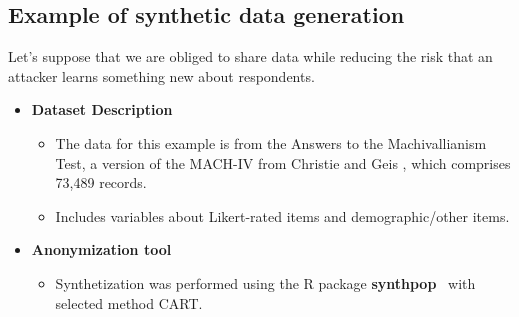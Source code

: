 \documentclass[a0,portrait]{a0poster}
\begin{document}
\begin{multicols}{3}
\columnbreak %

\section{Example of synthetic data generation}

Let's suppose that we are obliged to share data 
while reducing the risk that an attacker learns something new about respondents.

\begin{itemize}
    \item[\ding{228}] \textbf{Dataset Description}
        \begin{itemize}   
            \item[\textbullet] The data for this example is from the Answers to the Machivallianism Test, a version of the MACH-IV from Christie and Geis \cite{Data}, which comprises 73,489 records.
            \item[\textbullet] Includes variables about Likert-rated items and demographic/other items.
        \end{itemize}
    \item[\ding{228}] \textbf{Anonymization tool}
        \begin{itemize}   
            \item[\textbullet] Synthetization was performed using the R package \textbf{synthpop}~\cite{2022_Synthpop}
             with selected method CART.
        \end{itemize}
\end{itemize}


\end{multicols}
\end{document}
